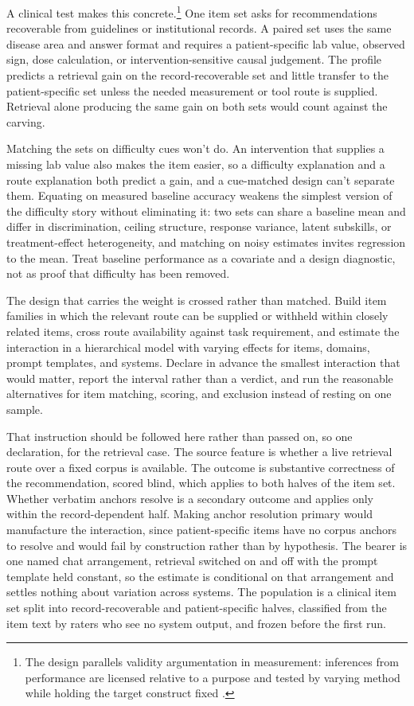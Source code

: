 \documentclass[12pt]{article}
\begin{document}
A clinical test makes this concrete.\footnote{The design parallels validity
argumentation in measurement: inferences from performance are licensed relative to a
purpose and tested by varying method while holding the target construct fixed
\citep{messick_1989_validity,kane2013validating}.} One item set asks for recommendations
recoverable from guidelines or institutional records. A paired set uses the same disease
area and answer format and requires a patient-specific lab value, observed sign, dose
calculation, or intervention-sensitive causal judgement. The profile
predicts a retrieval gain on the record-recoverable set and little transfer to the
patient-specific set unless the needed measurement or tool route is supplied. Retrieval alone producing the same gain on
both sets would count against the carving.

Matching the sets on difficulty cues won't do. An
intervention that supplies a missing lab value also makes the item easier, so a
difficulty explanation and a route explanation both predict a gain, and a cue-matched
design can't separate them. Equating on measured baseline accuracy weakens the simplest
version of the difficulty story without eliminating it: two sets can share a baseline mean
and differ in discrimination, ceiling structure, response variance, latent subskills, or
treatment-effect heterogeneity, and matching on noisy estimates invites regression to the
mean. Treat baseline performance as a covariate and a design diagnostic, not as proof that
difficulty has been removed.

The design that carries the weight is crossed rather than matched. Build item families in
which the relevant route can be supplied or withheld within closely related items, cross
route availability against task requirement, and estimate the interaction in a
hierarchical model with varying effects for items, domains, prompt templates, and systems.
Declare in advance the smallest interaction that would matter, report the interval rather
than a verdict, and run the reasonable alternatives for item matching, scoring, and
exclusion instead of resting on one sample.

That instruction should be followed here rather than passed on, so one declaration, for the
retrieval case. The source feature is whether a live retrieval route over a fixed corpus is
available. The outcome is substantive correctness of the recommendation, scored blind, which
applies to both halves of the item set. Whether verbatim anchors resolve is a secondary
outcome and applies only within the record-dependent half. Making anchor resolution primary
would manufacture the interaction, since patient-specific items have no corpus anchors to
resolve and would fail by construction rather than by hypothesis. The bearer is one named
chat arrangement, retrieval switched on and off with the prompt template held constant, so
the estimate is conditional on that arrangement and settles nothing about variation across
systems. The population is a clinical item set split into record-recoverable and
patient-specific halves, classified from the item text by raters who see no system output,
and frozen before the first run.
\end{document}
